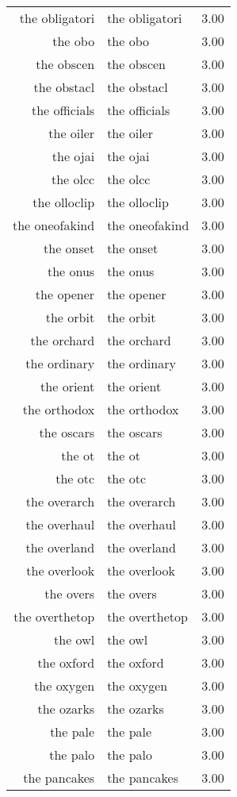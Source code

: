 \begin{table}[ht]
\begin{tabular}{rlr}
  the obligatori & the obligatori & 3.00 \\ 
  the obo & the obo & 3.00 \\ 
  the obscen & the obscen & 3.00 \\ 
  the obstacl & the obstacl & 3.00 \\ 
  the officials & the officials & 3.00 \\ 
  the oiler & the oiler & 3.00 \\ 
  the ojai & the ojai & 3.00 \\ 
  the olcc & the olcc & 3.00 \\ 
  the olloclip & the olloclip & 3.00 \\ 
  the oneofakind & the oneofakind & 3.00 \\ 
  the onset & the onset & 3.00 \\ 
  the onus & the onus & 3.00 \\ 
  the opener & the opener & 3.00 \\ 
  the orbit & the orbit & 3.00 \\ 
  the orchard & the orchard & 3.00 \\ 
  the ordinary & the ordinary & 3.00 \\ 
  the orient & the orient & 3.00 \\ 
  the orthodox & the orthodox & 3.00 \\ 
  the oscars & the oscars & 3.00 \\ 
  the ot & the ot & 3.00 \\ 
  the otc & the otc & 3.00 \\ 
  the overarch & the overarch & 3.00 \\ 
  the overhaul & the overhaul & 3.00 \\ 
  the overland & the overland & 3.00 \\ 
  the overlook & the overlook & 3.00 \\ 
  the overs & the overs & 3.00 \\ 
  the overthetop & the overthetop & 3.00 \\ 
  the owl & the owl & 3.00 \\ 
  the oxford & the oxford & 3.00 \\ 
  the oxygen & the oxygen & 3.00 \\ 
  the ozarks & the ozarks & 3.00 \\ 
  the pale & the pale & 3.00 \\ 
  the palo & the palo & 3.00 \\ 
  the pancakes & the pancakes & 3.00 \\ 

\end{tabular}
\end{table}
